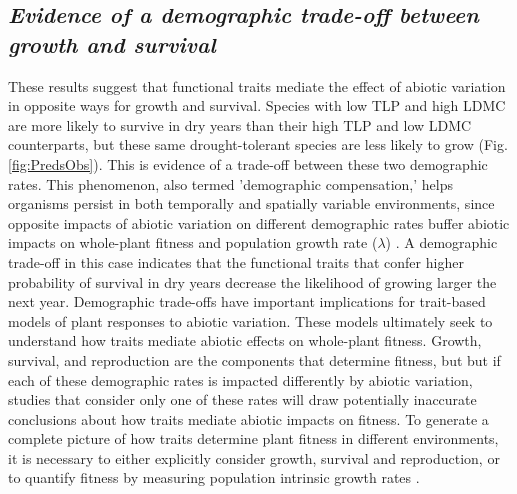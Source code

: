 \documentclass[12pt, letterpaper]{article}
\begin{document}
\subsection{\textit{Evidence of a demographic trade-off between growth and survival}} These results suggest that functional traits mediate the effect of abiotic variation in opposite ways for growth and survival. Species with low TLP and high LDMC are more likely to survive in dry years than their high TLP and low LDMC counterparts, but these same drought-tolerant species are less likely to grow (Fig. \ref{fig:PredsObs}). This is evidence of a trade-off between these two demographic rates. This phenomenon, also termed 'demographic compensation,' helps organisms persist in both temporally and spatially variable environments, since opposite impacts of abiotic variation on different demographic rates buffer abiotic impacts on whole-plant fitness and population growth rate ($\lambda$) \citep{Villellas2015DemographicImplications, Doak2010DemographicShifts}. A demographic trade-off in this case indicates that the functional traits that confer higher probability of survival in dry years decrease the likelihood of growing larger the next year. Demographic trade-offs have important implications for trait-based models of plant responses to abiotic variation. These models ultimately seek to understand how traits mediate abiotic effects on whole-plant fitness. Growth, survival, and reproduction are the components that determine fitness, but but if each of these demographic rates is impacted differently by abiotic variation, studies that consider only one of these rates will draw potentially inaccurate conclusions about how traits mediate abiotic impacts on fitness. To generate a complete picture of how traits determine plant fitness in different environments, it is necessary to either explicitly consider growth, survival and reproduction, or to quantify fitness by measuring population intrinsic growth rates \citep{Laughlin2020TheFitness}.  
\end{document}
